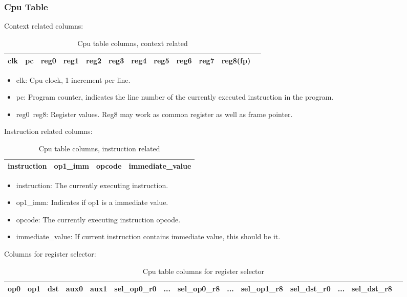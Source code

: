 \subsubsection{Cpu Table} \label{sec:cpu-table}

Context related columns:
\begin{table}[!ht]
    \centering
    \begin{tabular}{|c|c|c|c|c|c|c|c|c|c|c|c|}
        \hline
        clk & pc & reg0 & reg1 & reg2 & reg3 & reg4 & reg5 & reg6 & reg7 & reg8(fp) \\
        \hline
    \end{tabular}
    \caption{Cpu table columns, context related}
    \label{table:cpu-columns-context}
\end{table}

\begin{itemize}
    \item clk: Cpu clock, 1 increment per line.
    \item pc: Program counter, indicates the line number of the currently executed instruction in the program.
    \item reg0~reg8: Register values. Reg8 may work as common register as well as frame pointer.
\end{itemize}

Instruction related columns:
\begin{table}[!ht]
    \centering
    \begin{tabular}{|c|c|c|c|}
        \hline
        instruction & op1\_imm & opcode & immediate\_value \\
        \hline
    \end{tabular}
    \caption{Cpu table columns, instruction related}
    \label{table:cpu-columns-instruction}
\end{table}

\begin{itemize}
    \item instruction: The currently executing instruction.
    \item op1\_imm: Indicates if op1 is a immediate value.
    \item opcode: The currently executing instruction opcode.
    \item immediate\_value: If current instruction contains immediate value, this should be it.
\end{itemize}

Columns for register selector:
\begin{table}[!ht]
    \centering
    \begin{tabular}{|c|c|c|c|c|c|c|c|c|c|c|c|c|c|}
        \hline
        op0 & op1 & dst & aux0 & aux1 & sel\_op0\_r0 & ... & sel\_op0\_r8 & ... & sel\_op1\_r8 & sel\_dst\_r0 & ... & sel\_dst\_r8 \\
        \hline
    \end{tabular}
    \caption{Cpu table columns for register selector}
    \label{table:cpu-columns-reg-selector}
\end{table}


